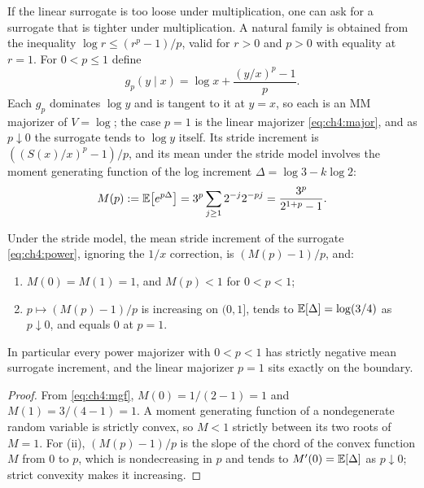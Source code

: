 If the linear surrogate is too loose under multiplication, one can ask for a
surrogate that is tighter under multiplication.  A natural family is obtained
from the inequality $\log r\le(r^{p}-1)/p$, valid for $r>0$ and $p>0$ with
equality at $r=1$.  For $0<p\le1$ define
\begin{equation}\label{eq:ch4:power}
  g_p(y\mid x)=\log x+\frac{(y/x)^{p}-1}{p}.
\end{equation}
Each $g_p$ dominates $\log y$ and is tangent to it at $y=x$, so each is an MM
majorizer of $V=\log$; the case $p=1$ is the linear majorizer
\eqref{eq:ch4:major}, and as $p\downarrow0$ the surrogate tends to $\log y$
itself.  Its stride increment is $((S(x)/x)^{p}-1)/p$, and its mean under the
stride model involves the moment generating function of the log increment
$\Delta=\log3-k\log2$:
\begin{equation}\label{eq:ch4:mgf}
  M(p):=\mathbb{E}\bigl[e^{p\Delta}\bigr]=3^{p}\sum_{j\ge1}2^{-j}2^{-pj}
  =\frac{3^{p}}{2^{1+p}-1}.
\end{equation}

\begin{proposition}\label{prop:ch4:power}
Under the stride model, the mean stride increment of the surrogate
\eqref{eq:ch4:power}, ignoring the $1/x$ correction, is $(M(p)-1)/p$, and:
\begin{enumerate}[label=(\roman*)]
\item $M(0)=M(1)=1$, and $M(p)<1$ for $0<p<1$;
\item $p\mapsto(M(p)-1)/p$ is increasing on $(0,1]$, tends to
  $\mathbb{E}[\Delta]=\log(3/4)$ as $p\downarrow0$, and equals $0$ at $p=1$.
\end{enumerate}
In particular every power majorizer with $0<p<1$ has strictly negative mean
surrogate increment, and the linear majorizer $p=1$ sits exactly on the
boundary.
\end{proposition}

\begin{proof}
From \eqref{eq:ch4:mgf}, $M(0)=1/(2-1)=1$ and $M(1)=3/(4-1)=1$.  A moment
generating function of a nondegenerate random variable is strictly convex, so
$M<1$ strictly between its two roots of $M=1$.  For (ii), $(M(p)-1)/p$ is the
slope of the chord of the convex function $M$ from $0$ to $p$, which is
nondecreasing in $p$ and tends to $M'(0)=\mathbb{E}[\Delta]$ as $p\downarrow0$; strict
convexity makes it increasing.
\end{proof}

